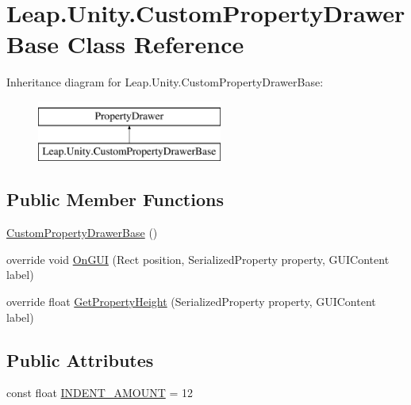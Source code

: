 \hypertarget{class_leap_1_1_unity_1_1_custom_property_drawer_base}{}\section{Leap.\+Unity.\+Custom\+Property\+Drawer\+Base Class Reference}
\label{class_leap_1_1_unity_1_1_custom_property_drawer_base}
Inheritance diagram for Leap.\+Unity.\+Custom\+Property\+Drawer\+Base\+:\begin{figure}[H]
\begin{center}
\leavevmode
\includegraphics[height=2.000000cm]{class_leap_1_1_unity_1_1_custom_property_drawer_base}
\end{center}
\end{figure}
\subsection*{Public Member Functions}
\begin{DoxyCompactItemize}
\item 
\mbox{\hyperlink{class_leap_1_1_unity_1_1_custom_property_drawer_base_a1ea66e1186afcd296e95407337093f7d}{Custom\+Property\+Drawer\+Base}} ()
\item 
override void \mbox{\hyperlink{class_leap_1_1_unity_1_1_custom_property_drawer_base_a7a817930dcea770d52ef267ce720c650}{On\+G\+UI}} (Rect position, Serialized\+Property property, G\+U\+I\+Content label)
\item 
override float \mbox{\hyperlink{class_leap_1_1_unity_1_1_custom_property_drawer_base_a302e44c3a3a0dae054573810855c219e}{Get\+Property\+Height}} (Serialized\+Property property, G\+U\+I\+Content label)
\end{DoxyCompactItemize}
\subsection*{Public Attributes}
\begin{DoxyCompactItemize}
\item 
const float \mbox{\hyperlink{class_leap_1_1_unity_1_1_custom_property_drawer_base_a9a3423b6bcde5af34f26eb046f47e094}{I\+N\+D\+E\+N\+T\+\_\+\+A\+M\+O\+U\+NT}} = 12
\end{DoxyCompactItemize}
